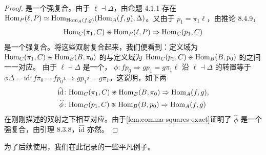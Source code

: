 \begin{proof}
{是一个强复合。由于 $\ell\dashv\Delta$，由命题 4.1.1 存在\trEquivalence{}
$\mathrm{Hom}_{P}(\ell,P)\simeq\allowbreak\mathrm{Hom}_{\mathrm{Hom}_{A}(f,g)}(\mathrm{Hom}_{A}(f,g),\Delta)$。又由于 $p_{1}=\pi_{1}\ell$，由推论 8.4.9，\trCanonical{}\trCell
\begin{equation*}
\mathrm{Hom}_{C}(\pi_{1},C)\divideontimes\mathrm{Hom}_{P}(\ell,P)\Rightarrow\mathrm{Hom}_{C}(p_{1},C)
\end{equation*}}
是一个强复合。将这些双射复合起来，我们便看到：定义域为
$\mathrm{Hom}_{C}(\pi_{1},C)\divideontimes\mathrm{Hom}_{B}(B,\pi_{0})$ 的\trCell{}与定义域为
$\mathrm{Hom}_{C}(p_{1},C)\divideontimes\mathrm{Hom}_{B}(B,p_{0})$ 的\trCell{}之间一一对应。
由于 $\ell\dashv\Delta$ 是一个\trFiberedAdjunction{}，\trNaturalTransformation{}
$\phi\colon fp_{0}\Rightarrow gp_{1}=g\pi_{1}\ell$ 沿 $\ell\dashv\Delta$ 的转置等于
$\phi\Delta=\mathrm{id}\colon f\pi_{0}=fp_{0}i\Rightarrow gp_{1}i=g\pi_{1}$。这说明，如下两\trCell
\begin{equation*}
\begin{aligned}
\widehat{\mathrm{id}}&\colon\mathrm{Hom}_{C}(\pi_{1},C)\divideontimes\mathrm{Hom}_{B}(B,\pi_{0})\Rightarrow\mathrm{Hom}_{A}(f,g),\\
\widehat{\phi}&\colon\mathrm{Hom}_{C}(p_{1},C)\divideontimes\mathrm{Hom}_{B}(B,p_{0})\Rightarrow\mathrm{Hom}_{A}(f,g)
\end{aligned}
\end{equation*}
在刚刚描述的双射之下相互对应。由于\cref{lem:comma-squares-exact}证明了 $\widehat{\phi}$ 是一个强复合，由引理 8.3.8，$\widehat{\mathrm{id}}$ 亦然。
\end{proof}

为了后续使用，我们在此记录\trExactSquare{}的一些平凡例子。

